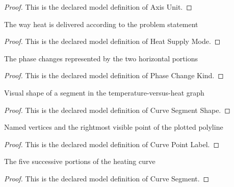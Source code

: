\begin{proof}
  This is the declared model definition of Axis Unit.
\end{proof}
\begin{definition}
  \label{def:physics:phyx-mini-0405:phyxminiproblems-problemphyxmini0405-heatsupplymode}
  The way heat is delivered according to the problem statement
\end{definition}
\begin{proof}
  This is the declared model definition of Heat Supply Mode.
\end{proof}
\begin{definition}
  \label{def:physics:phyx-mini-0405:phyxminiproblems-problemphyxmini0405-phasechangekind}
  The phase changes represented by the two horizontal portions
\end{definition}
\begin{proof}
  This is the declared model definition of Phase Change Kind.
\end{proof}
\begin{definition}
  \label{def:physics:phyx-mini-0405:phyxminiproblems-problemphyxmini0405-curvesegmentshape}
  Visual shape of a segment in the temperature-versus-heat graph
\end{definition}
\begin{proof}
  This is the declared model definition of Curve Segment Shape.
\end{proof}
\begin{definition}
  \label{def:physics:phyx-mini-0405:phyxminiproblems-problemphyxmini0405-curvepointlabel}
  Named vertices and the rightmost visible point of the plotted polyline
\end{definition}
\begin{proof}
  This is the declared model definition of Curve Point Label.
\end{proof}
\begin{definition}
  \label{def:physics:phyx-mini-0405:phyxminiproblems-problemphyxmini0405-curvesegment}
  The five successive portions of the heating curve
\end{definition}
\begin{proof}
  This is the declared model definition of Curve Segment.
\end{proof}
